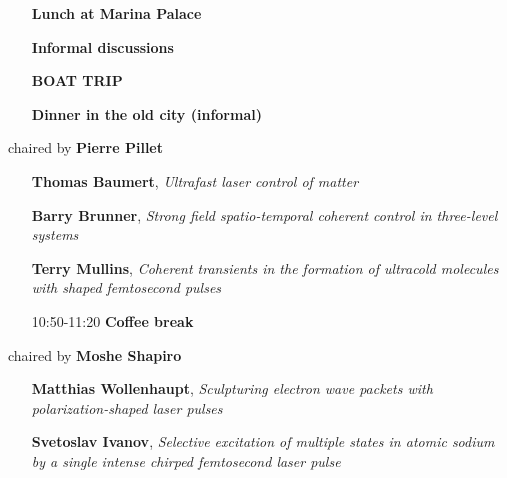 {\vsp
\begin{itemize}
\item[\time{13:00-14:00}] \textbf{Lunch at Marina Palace}
\end{itemize}
\vsp

\vsp
\begin{itemize}
\item[\time{14:00-16:00}] \textbf{Informal discussions}
\end{itemize}
\vsp

\vsp
\begin{itemize}
\item[\time{16:00-20:00}] \textbf{BOAT TRIP}
\end{itemize}
\vsp

\vsp
\begin{itemize}
\item[\time{20:00-22:00}] \textbf{Dinner in the old city (informal)}
\end{itemize}
\vsp

\newpage



 chaired by \textbf{Pierre Pillet}\vsp
\begin{itemize}
\item[\time{09:00-09:40}] \textbf{Thomas Baumert}, \emph{Ultrafast laser control of matter}
\item[\time{09:40-10:20}] \textbf{Barry Brunner}, \emph{Strong field spatio-temporal coherent control in three-level
systems}
\item[\time{10:20-10:50}] \textbf{Terry Mullins}, \emph{Coherent transients in the formation of ultracold molecules
with shaped femtosecond pulses}
\end{itemize}

\vsp
\begin{itemize}
\item[10:50-11:20] \textbf{Coffee break}
\end{itemize}
\vsp

 chaired by \textbf{Moshe Shapiro}\vsp
\begin{itemize}
\item[\time{11:20-12:00}] \textbf{Matthias Wollenhaupt}, \emph{Sculpturing electron wave packets with polarization-shaped
laser pulses}
\item[\time{12:00-12:30}] \textbf{Svetoslav Ivanov}, \emph{Selective excitation of multiple states in atomic sodium by a single
intense chirped femtosecond laser pulse}
\end{itemize}


}
